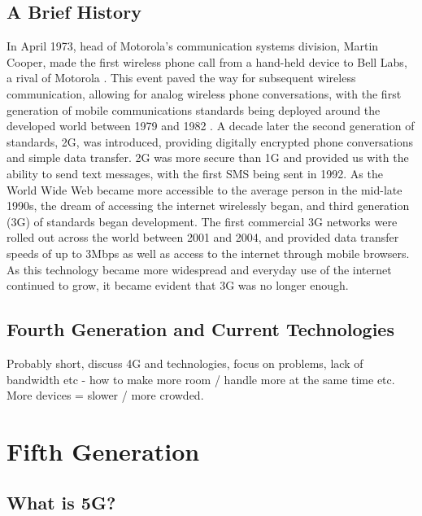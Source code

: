 \documentclass[journal]{IEEEtran}
\begin{document}
\subsection{A Brief History}
In April 1973, head of Motorola's communication systems division, Martin Cooper, made the first wireless phone call from a hand-held device to Bell Labs, a rival of Motorola \cite{tomfarhist}. This event paved the way for subsequent wireless communication, allowing for analog wireless phone conversations, with the first generation of mobile communications standards being deployed around the developed world between 1979 and 1982 \cite{evolution}. A decade later the second generation of standards, 2G, was introduced, providing digitally encrypted phone conversations and simple data transfer. 2G was more secure than 1G and provided us with the ability to send text messages, with the first SMS being sent in 1992. As the World Wide Web became more accessible to the average person in the mid-late 1990s, the dream of accessing the internet wirelessly began, and third generation (3G) of standards began development. The first commercial 3G networks were rolled out across the world between 2001 and 2004, and provided data transfer speeds of up to 3Mbps \cite{tomfarhist} as well as access to the internet through mobile browsers. As this technology became more widespread and everyday use of the internet continued to grow, it became evident that 3G was no longer enough.
\subsection{Fourth Generation and Current Technologies}

Probably short, discuss 4G and technologies, focus on problems, lack of bandwidth etc - how to make more room / handle more at the same time etc. More devices = slower / more crowded.

\section{Fifth Generation}
\subsection{What is 5G?}
\end{document}

